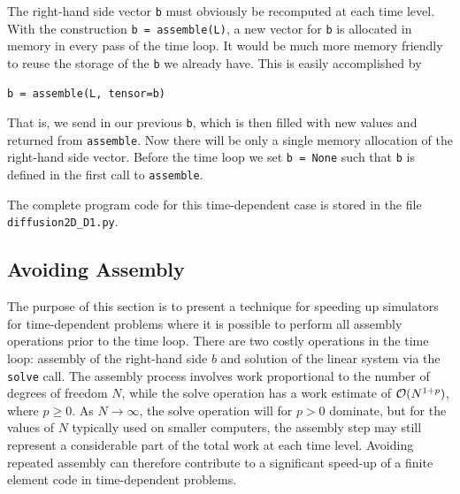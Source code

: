 The right-hand side vector {\fontsize{12pt}{12pt}\texttt{b}} must obviously
be recomputed at each time level.
With the construction {\fontsize{12pt}{12pt}\texttt{b = assemble(L)}}, a new
vector for {\fontsize{12pt}{12pt}\texttt{b}} is allocated in memory in every pass of the time loop.
It would be much more memory friendly to reuse the storage of the {\fontsize{12pt}{12pt}\texttt{b}}
we already have.
This is easily accomplished by
\begin{Verbatim}[fontsize=\fontsize{10pt}{10pt},tabsize=8,baselinestretch=1.05,
fontfamily=tt,xleftmargin=7mm]
    b = assemble(L, tensor=b)
\end{Verbatim}
\noindent
That is, we send in our previous {\fontsize{12pt}{12pt}\texttt{b}}, which is then filled with new values
and returned from {\fontsize{12pt}{12pt}\texttt{assemble}}. Now there will be only a single
memory allocation of the right-hand side vector. Before the time loop
we set {\fontsize{12pt}{12pt}\texttt{b = None}} such that {\fontsize{12pt}{12pt}\texttt{b}} is defined in the first call to
{\fontsize{12pt}{12pt}\texttt{assemble}}.

The complete program code for this time-dependent case is stored in
the file {\fontsize{12pt}{12pt}\verb!diffusion2D_D1.py!}.

\subsection{Avoiding Assembly}
\label{langtangen:timedep:diffusion1:noassemble}

The purpose of this section is to present a technique for speeding
up \fenics{} simulators for time-dependent problems where it is
possible to perform all assembly operations prior to the time loop.
There are two costly operations in the time loop: assembly of the
right-hand side $b$ and solution of the linear system via the
{\fontsize{12pt}{12pt}\texttt{solve}} call. The assembly process involves work proportional to
the number of degrees of freedom $N$, while the solve operation
has a work estimate of ${\cal O}( N^{1+p})$, where $p\geq 0$. As
$N\rightarrow\infty$, the solve operation will for $p>0$ dominate,
but for the values of $N$ typically used on smaller computers, the
assembly step may still
represent a considerable part of the total work at each
time level. Avoiding repeated assembly can therefore contribute to a
significant speed-up of a finite element code in time-dependent problems.

